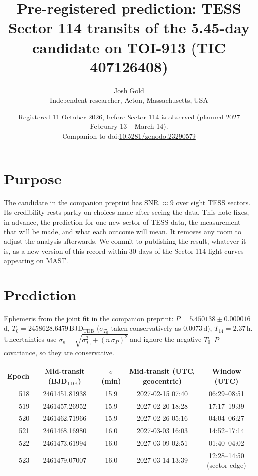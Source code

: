 \documentclass[11pt]{article}
\title{\textbf{Pre-registered prediction: TESS Sector 114 transits of the 5.45-day candidate on TOI-913 (TIC 407126408)}}
\author{Josh Gold\\ \small Independent researcher, Acton, Massachusetts, USA}
\date{\small Registered 11 October 2026, before Sector 114 is observed (planned 2027 February 13 -- March 14).\\ Companion to doi:\href{https://doi.org/10.5281/zenodo.23290579}{10.5281/zenodo.23290579}}
\begin{document}
\sloppy
\maketitle

\section*{Purpose}
The candidate in the companion preprint has SNR $\approx 9$ over eight TESS sectors. Its credibility rests partly on choices made after seeing the data. This note fixes, in advance, the prediction for one new sector of TESS data, the measurement that will be made, and what each outcome will mean. It removes any room to adjust the analysis afterwards. We commit to publishing the result, whatever it is, as a new version of this record within 30 days of the Sector 114 light curves appearing on MAST.

\section*{Prediction}
Ephemeris from the joint fit in the companion preprint: $P = 5.450138 \pm 0.000016$\,d, $T_0 = 2458628.6479$\,BJD$_\mathrm{TDB}$ ($\sigma_{T_0}$ taken conservatively as 0.0073\,d), $T_{14} = 2.37$\,h. Uncertainties use $\sigma_n = \sqrt{\sigma_{T_0}^2 + (n\,\sigma_P)^2}$ and ignore the negative $T_0$--$P$ covariance, so they are conservative.

\begin{center}\footnotesize
\begin{tabular}{rcccc}
\toprule
Epoch & Mid-transit (BJD$_\mathrm{TDB}$) & $\sigma$ (min) & Mid-transit (UTC, geocentric) & Window (UTC) \\
\midrule
518 & 2461451.81938 & 15.9 & 2027-02-15 07:40 & 06:29--08:51 \\
519 & 2461457.26952 & 15.9 & 2027-02-20 18:28 & 17:17--19:39 \\
520 & 2461462.71966 & 15.9 & 2027-02-26 05:16 & 04:04--06:27 \\
521 & 2461468.16980 & 16.0 & 2027-03-03 16:03 & 14:52--17:14 \\
522 & 2461473.61994 & 16.0 & 2027-03-09 02:51 & 01:40--04:02 \\
523 & 2461479.07007 & 16.0 & 2027-03-14 13:39 & 12:28--14:50 (sector edge) \\
\bottomrule
\end{tabular}
\end{center}
\end{document}
